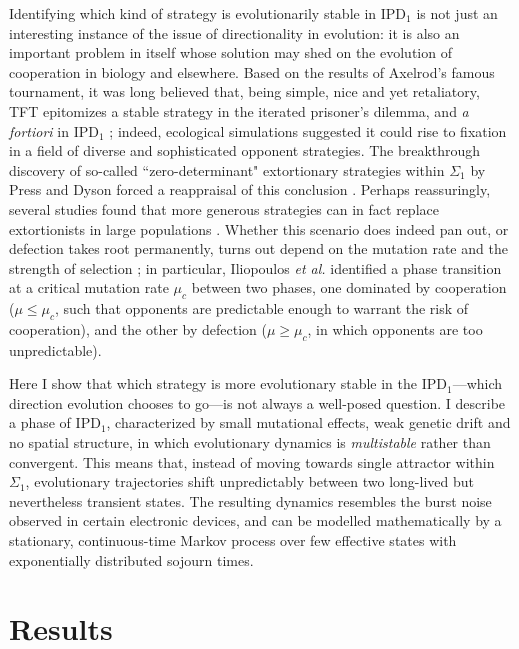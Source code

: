 \documentclass[12pt]{article}
\def\IPD{\textrm{IPD}}
\def\IPD1{\textrm{IPD}_1}
\begin{document}
Identifying which kind of strategy is evolutionarily stable in $\IPD1$ is not just an interesting instance of the issue of directionality in evolution: it is also an important problem in itself whose solution may shed on the evolution of cooperation in biology and elsewhere. Based on the results of Axelrod's famous tournament, it was long believed that, being simple, nice and yet retaliatory, TFT epitomizes a stable strategy in the iterated prisoner's dilemma, and \emph{a fortiori} in $\IPD1$ \cite{axelrod_evolution_1981}; indeed, ecological simulations suggested it could rise to fixation in a field of diverse and sophisticated opponent strategies. The breakthrough discovery of so-called ``zero-determinant" extortionary strategies within $\Sigma_1$ by Press and Dyson \cite{press_iterated_2012} forced a reappraisal of this conclusion \cite{ball_physicists_2012}. Perhaps reassuringly, several studies found that more generous strategies can in fact replace extortionists in large populations \cite{adami_evolutionary_2013,stewart_extortion_2013}. Whether this scenario does indeed pan out, or defection takes root permanently, turns out depend on the mutation rate and the strength of selection \cite{stewart_extortion_2013, iliopoulos_critical_2010}; in particular, Iliopoulos \emph{et al.} identified a phase transition at a critical mutation rate $\mu_c$ between two phases, one dominated by cooperation ($\mu \leq \mu_c$, such that opponents are predictable enough to warrant the risk of cooperation), and the other by defection ($\mu \geq \mu_c$, in which opponents are too unpredictable).

Here I show that which strategy is more evolutionary stable in the $\IPD1$---which direction evolution chooses to go---is not always a well-posed question. I describe a phase of $\IPD1$, characterized by small mutational effects, weak genetic drift and no spatial structure, in which evolutionary dynamics is \emph{multistable} rather than convergent. This means that, instead of moving towards single attractor within $\Sigma_1$, evolutionary trajectories shift unpredictably between two long-lived but nevertheless transient states. The resulting dynamics resembles the burst noise observed in certain electronic devices, and can be modelled mathematically by a stationary, continuous-time Markov process over few effective states with exponentially distributed sojourn times. 

\section*{Results}
\end{document}
